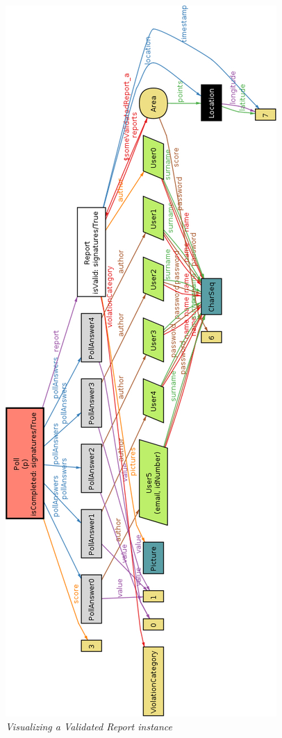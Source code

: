 \begin{figure}
  \centering
  \includegraphics[origin=c,width=\textwidth,height=.95\textheight,keepaspectratio]{RASD_Images/AlloyWorlds/someValidatedReports.jpg}
  \caption{\textit{Visualizing a Validated Report instance}}
\end{figure}
\newpage

